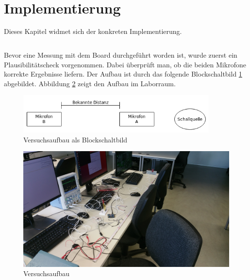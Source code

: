 \newpage
\section{Implementierung}
Dieses Kapitel widmet sich der konkreten Implementierung.

\subsection{\microphone}
Bevor eine Messung mit dem Board durchgeführt worden ist, wurde zuerst ein Plausibilitätscheck vorgenommen. Dabei überprüft man, ob die beiden \microphone \platz Mikrofone korrekte Ergebnisse liefern. Der Aufbau ist durch das folgende Blockschaltbild \ref{img:blockschaltbild_plausibilitaetscheck} abgebildet. Abbildung \ref{img:picture_plausibilitaetscheck} zeigt den Aufbau im Laborraum.

\begin{figure}[H]
        \centering
        \includegraphics[width=0.9\textwidth]{images/plausibilitaetscheck.png}
        \caption{Versuchsaufbau als Blockschaltbild}
        \label{img:blockschaltbild_plausibilitaetscheck}
\end{figure}

\begin{figure}[H]
        \centering
        \hspace*{-1.9cm}
        \includegraphics[width=1.2\textwidth]{images/plausibilitaetscheck_sparkfun_foto.jpg}
        \caption{Versuchsaufbau}
        \label{img:picture_plausibilitaetscheck}
\end{figure}

